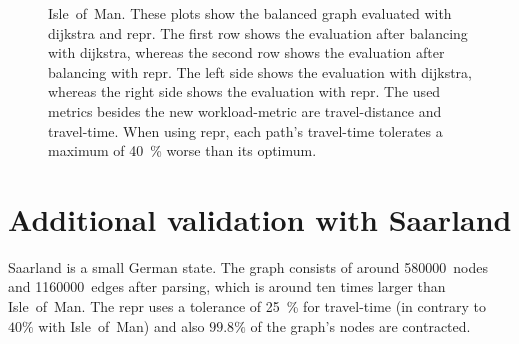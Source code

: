         \begin{figure}[hbp]
            \centering%
            \hfill%

            \hfill%
            \caption[Workloads on the balanced graph of Isle~of~Man]{%
                Isle~of~Man.
                These plots show the balanced graph evaluated with \gls{dijkstra} and \gls{repr}.
                The first row shows the evaluation after \gls{balancing} with \gls{dijkstra}, whereas the second row shows the evaluation after \gls{balancing} with \gls{repr}.
                The left side shows the evaluation with \gls{dijkstra}, whereas the right side shows the evaluation with \gls{repr}.
                The used \glspl{metric} besides the new workload-\gls{metric} are travel-distance and travel-time.
                When using \gls{repr}, each path's travel-time tolerates a maximum of \si{\num{40} \percent} worse than its optimum.
                \label{fig:isle_of_man/both/both/1/workloads}
            }
        \end{figure}

    \section{Additional validation with Saarland}

        Saarland is a small German state.
        The graph consists of around \num{580000}~nodes and \num{1160000}~edges after parsing, which is around ten times larger than Isle~of~Man.
        The \gls{repr} uses a tolerance of \si{25 \percent} for travel-time (in contrary to $\si{40 \percent}$ with Isle~of~Man) and also $\si{\num{99.8} \percent}$ of the graph's nodes are contracted.

